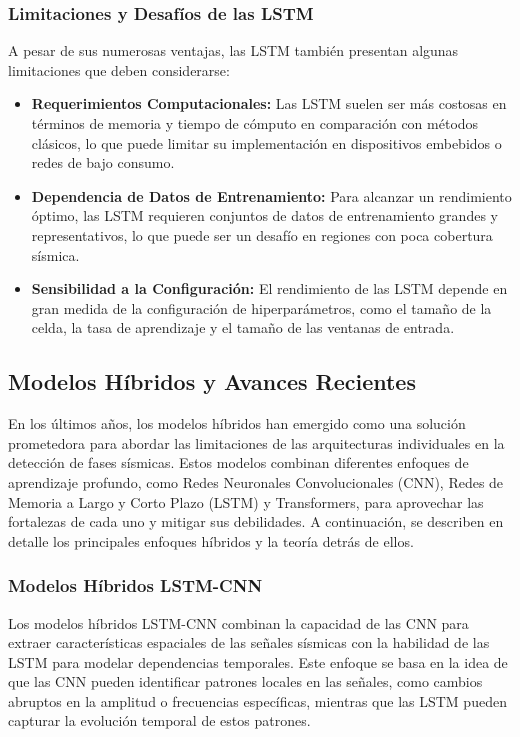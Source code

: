 \subsubsection{Limitaciones y Desafíos de las LSTM}

A pesar de sus numerosas ventajas, las LSTM también presentan algunas limitaciones que deben considerarse:

\begin{itemize}
    \item \textbf{Requerimientos Computacionales:} Las LSTM suelen ser más costosas en términos de memoria y tiempo de cómputo en comparación con métodos clásicos, lo que puede limitar su implementación en dispositivos embebidos o redes de bajo consumo.

    \item \textbf{Dependencia de Datos de Entrenamiento:} Para alcanzar un rendimiento óptimo, las LSTM requieren conjuntos de datos de entrenamiento grandes y representativos, lo que puede ser un desafío en regiones con poca cobertura sísmica.

    \item \textbf{Sensibilidad a la Configuración:} El rendimiento de las LSTM depende en gran medida de la configuración de hiperparámetros, como el tamaño de la celda, la tasa de aprendizaje y el tamaño de las ventanas de entrada.
\end{itemize}

\subsection{Modelos Híbridos y Avances Recientes}

En los últimos años, los modelos híbridos han emergido como una solución prometedora para abordar las limitaciones de las arquitecturas individuales en la detección de fases sísmicas. Estos modelos combinan diferentes enfoques de aprendizaje profundo, como Redes Neuronales Convolucionales (CNN), Redes de Memoria a Largo y Corto Plazo (LSTM) y Transformers, para aprovechar las fortalezas de cada uno y mitigar sus debilidades. A continuación, se describen en detalle los principales enfoques híbridos y la teoría detrás de ellos.

\subsubsection{Modelos Híbridos LSTM-CNN}

Los modelos híbridos LSTM-CNN combinan la capacidad de las CNN para extraer características espaciales de las señales sísmicas con la habilidad de las LSTM para modelar dependencias temporales. Este enfoque se basa en la idea de que las CNN pueden identificar patrones locales en las señales, como cambios abruptos en la amplitud o frecuencias específicas, mientras que las LSTM pueden capturar la evolución temporal de estos patrones.

